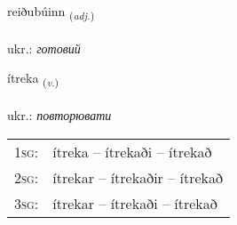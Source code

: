 \documentclass[frontgrid, backgrid]{flacards}\usepackage[]{graphicx}\usepackage[]{xcolor}
\begin{document}
\renewcommand{\flhead}{\vskip5pt \fboxsep=0pt {\small\bfseries\footnotesize Lýsingarorð | прикметник}}
\renewcommand{\fcfoot}{\vskip5pt \fboxsep=0pt \hspace{2pt}{\small\bfseries\footnotesize 3K}}

\renewcommand{\blhead}{\vskip5pt {\small\bfseries\footnotesize Lýsingarorð | прикметник }}
\renewcommand{\bcfoot}{\vskip5pt \hspace{2pt}{\small\bfseries\footnotesize 3K}}


{reiðubúinn \small{\textsubscript{(\textit{adj.})}} \\[1ex] %
\textphonetic{[reiːðʏpuɪn]} \\
ukr.: \emph{готовий} \\  [2ex]
\renewcommand*{\arraystretch}{0.8}
}

\renewcommand{\flhead}{\vskip5pt \fboxsep=0pt {\small\bfseries\footnotesize Sagnorð | дієслово}}
\renewcommand{\fcfoot}{\vskip5pt \fboxsep=0pt \hspace{2pt}{\small\bfseries\footnotesize 3K}}

\renewcommand{\blhead}{\vskip5pt {\small\bfseries\footnotesize Sagnorð | дієслово }}
\renewcommand{\bcfoot}{\vskip5pt \hspace{2pt}{\small\bfseries\footnotesize 3K}}


{ítreka \small{\textsubscript{(\textit{v.})}} \\[1ex] %
\textphonetic{[iːtrɛka]} \\
ukr.: \emph{повторювати} \\  [2ex]
\renewcommand*{\arraystretch}{0.8}
\begin{tabular}{p{1cm}l}
\textsc{1sg}: & ítreka -- ítrekaði -- ítrekað \\ 
\textsc{2sg}: & ítrekar -- ítrekaðir -- ítrekað \\ 
\textsc{3sg}: & ítrekar -- ítrekaði -- ítrekað \\ 
\end{tabular}
}
\end{document}
